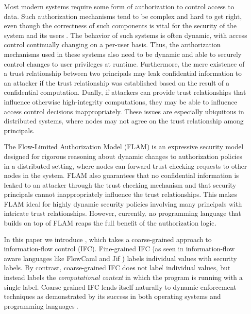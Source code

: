 Most modern systems require some form of authorization to control access to data. Such authorization mechanisms tend to be complex and hard to get right, even though the correctness of such components is vital for the security of the system and its users \cite{Ferraiolo:1999:RAC:300830.300834}. 
The behavior of such systems is often dynamic, with access control continually changing on a per-user basis. Thus, the authorization mechanisms used in these systems also need to be dynamic and able to securely control changes to user privileges \cite{Ferraiolo:1999:RAC:300830.300834} at runtime. Furthermore, the mere existence of a trust relationship between two principals may leak confidential information to an attacker if the trust relationship was established based on the result of a confidential computation. Dually, if attackers can provide trust relationships that influence otherwise high-integrity computations, they may be able to influence access control decisions inappropriately. These issues are especially ubiquitous in distributed systems, where nodes may not agree on the trust relationship among principals.

The Flow-Limited Authorization Model (FLAM) \cite{Arden:2015:FA:2859845.2859998} is an expressive security model designed for rigorous reasoning about dynamic changes to authorization policies in a distributed setting, where nodes can forward trust checking requests to other nodes in the system. FLAM also guarantees that no confidential information is leaked to an attacker through the trust checking mechanism and that security principals cannot inappropriately influence the trust relationships. This makes FLAM ideal for highly dynamic security policies involving many principals with intricate trust relationships. However, currently, no programming language that builds on top of FLAM reaps the full benefit of the authorization logic.

In this paper we introduce \lang{}, which takes a coarse-grained approach to information-flow control (IFC). Fine-grained IFC (as seen in information-flow aware languages like FlowCaml \cite{Pottier:2003:IFI:596980.596983} and Jif \cite{Myers:1999:JPM:292540.292561}) labels individual values with security labels. By contrast, coarse-grained IFC does not label individual values, but instead labels the \emph{computational context} in which the program is running with a single label. Coarse-grained IFC lends itself naturally to dynamic enforcement techniques as demonstrated by its success in both operating systems \cite{Zeldovich:2006:MIF:1267308.1267327, Zeldovich:2008:SDS:1387589.1387610, Efstathopoulos:2005:LEP:1095810.1095813, Krohn:2007:IFC:1294261.1294293} and programming languages \cite{SRMMlio, Buiras:2015:HMS:2784731.2784758, Stefan:2012:ACT:2364527.2364557, Buiras:2015:DED:2786558.2786563}.

